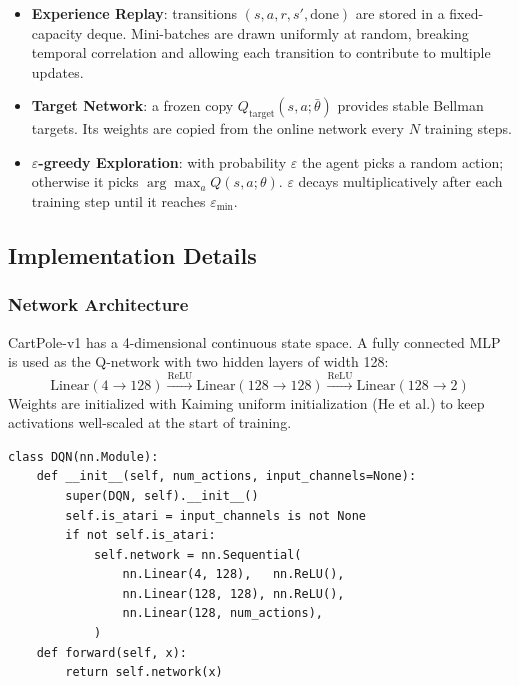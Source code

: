 \documentclass[12pt, a4paper]{report}
\begin{document}
\begin{itemize}
    \item \textbf{Experience Replay}: transitions $(s,a,r,s',\text{done})$ are stored in a
          fixed-capacity deque. Mini-batches are drawn uniformly at random, breaking temporal
          correlation and allowing each transition to contribute to multiple updates.
    \item \textbf{Target Network}: a frozen copy $Q_\text{target}(s,a;\bar{\theta})$ provides stable
          Bellman targets. Its weights are copied from the online network every $N$ training steps.
    \item \textbf{$\varepsilon$-greedy Exploration}: with probability $\varepsilon$ the agent
          picks a random action; otherwise it picks $\arg\max_a Q(s,a;\theta)$. $\varepsilon$ decays
          multiplicatively after each training step until it reaches $\varepsilon_\text{min}$.
\end{itemize}

\subsection{Implementation Details}

\subsubsection*{Network Architecture}

CartPole-v1 has a 4-dimensional continuous state space. A fully connected MLP is used as the
Q-network with two hidden layers of width 128:
\[
  \text{Linear}(4 \to 128) \xrightarrow{\text{ReLU}}
  \text{Linear}(128 \to 128) \xrightarrow{\text{ReLU}}
  \text{Linear}(128 \to 2)
\]
Weights are initialized with Kaiming uniform initialization (He et al.) to keep activations well-scaled
at the start of training.

\begin{lstlisting}[caption={DQN network for CartPole (Task 1).}]
class DQN(nn.Module):
    def __init__(self, num_actions, input_channels=None):
        super(DQN, self).__init__()
        self.is_atari = input_channels is not None
        if not self.is_atari:
            self.network = nn.Sequential(
                nn.Linear(4, 128),   nn.ReLU(),
                nn.Linear(128, 128), nn.ReLU(),
                nn.Linear(128, num_actions),
            )
    def forward(self, x):
        return self.network(x)
\end{lstlisting}
\end{document}
